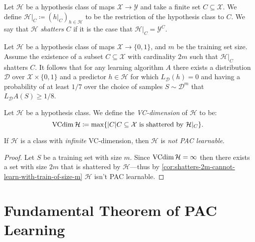 \begin{definition}
\label{def:restrict-hypothesis-class}
Let \(\mathcal{H}\) be a hypothesis class of maps \(\mathcal{X} \to \mathcal{Y}\) and take a finite set
\(C \subseteq \mathcal{X}\). We define \(\mathcal{H}|_C \coloneq (h|_C)_{h \in \mathcal{H}}\) to be the restriction of the
hypothesis class to \(C\). We say that \(\mathcal{H}\) \emph{shatters} \(C\) if it is the
case that \(\mathcal{H}|_C = \mathcal{Y}^{C}\).
\end{definition}

\begin{corollary}
\label{cor:shatters-2m-cannot-learn-with-train-of-size-m}
Let \(\mathcal{H}\) be a hypothesis class of maps \(\mathcal{X} \to \{0, 1\}\), and \(m\) be the
training set size. Assume the existence of a subset \(C \subseteq \mathcal{X}\) with cardinality
\(2 m\) such that \(\mathcal{H}|_C\) shatters \(C\). It follows that for any learning
algorithm \(A\) there exists a distribution \(\mathcal{D}\) over \(\mathcal{X} \times \{0, 1\}\) and a
predictor \(h \in \mathcal{H}\) for which \(L_{\mathcal{D}}(h) = 0\) and having a probability of at
least \(1/7\) over the choice of samples \(S \sim \mathcal{D}^m\) that \(L_{\mathcal{D}}A(S) \geq 1/8\).
\end{corollary}

\begin{definition}[VC-dimension]
\label{def:vc-dimension}
Let \(\mathcal{H}\) be a hypothesis class. We define the \emph{VC-dimension} of
\(\mathcal{H}\) to be:
\[
\operatorname{VCdim} \mathcal{H} \coloneq \max \{|C| \relax C \subseteq \mathcal{X} \text{ is shattered by } \mathcal{H}|_C\}.
\]
\end{definition}

\begin{theorem}
\label{thm:infinite-VC-dim-not-learnable}
If \(\mathcal{H}\) is a class with \emph{infinite} VC-dimension, then
\(\mathcal{H}\) is \emph{not PAC learnable}.
\end{theorem}

\begin{proof}
Let \(S\) be a training set with size \(m\). Since
\(\operatorname{VCdim} \mathcal{H} = \infty\) then there exists a set with size \(2 m\) that is shattered by
\(\mathcal{H}\)---thus by \cref{cor:shatters-2m-cannot-learn-with-train-of-size-m}
\(\mathcal{H}\) isn't PAC learnable.
\end{proof}

\section{Fundamental Theorem of PAC Learning}

